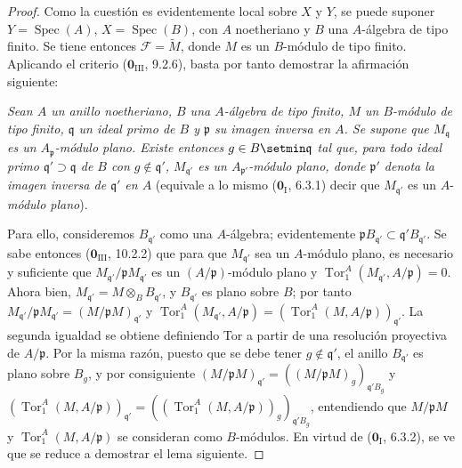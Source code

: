 \begin{proof}
Como la cuestión es evidentemente local sobre $X$ y $Y$, se puede suponer $Y=\operatorname{Spec}(A)$, $X=\operatorname{Spec}(B)$, con $A$ noetheriano y $B$ una $A$-álgebra de tipo finito. Se tiene entonces $\mathcal F=\widetilde M$, donde $M$ es un $B$-módulo de tipo finito. Aplicando el criterio ($\mathbf 0_{\mathrm{III}}$, 9.2.6), basta por tanto demostrar la afirmación siguiente:

\medskip
\begin{env}[11.1.1.1]
\label{IV.11.1.1.1}
\emph{Sean $A$ un anillo noetheriano, $B$ una $A$-álgebra de tipo finito, $M$ un $B$-módulo de tipo finito, $\mathfrak q$ un ideal primo de $B$ y $\mathfrak p$ su imagen inversa en $A$. Se supone que $M_{\mathfrak q}$ es un $A_{\mathfrak p}$-módulo plano. Existe entonces $g\in B\setmin\mathfrak q$ tal que, para todo ideal primo $\mathfrak q'\supset\mathfrak q$ de $B$ con $g\notin\mathfrak q'$, $M_{\mathfrak q'}$ es un $A_{\mathfrak p'}$-módulo plano, donde $\mathfrak p'$ denota la imagen inversa de $\mathfrak q'$ en $A$} (equivale a lo mismo ($\mathbf 0_{\mathrm I}$, 6.3.1) decir que $M_{\mathfrak q'}$ es un $A$-\emph{módulo plano}).
\end{env}
\medskip

Para ello, consideremos $B_{\mathfrak q'}$ como una $A$-álgebra; evidentemente
$\mathfrak pB_{\mathfrak q'}\subset\mathfrak q'B_{\mathfrak q'}$. Se sabe entonces
($\mathbf 0_{\mathrm{III}}$, 10.2.2) que para que $M_{\mathfrak q'}$ sea
un $A$-módulo plano, es necesario y suficiente que
$M_{\mathfrak q'}/\mathfrak pM_{\mathfrak q'}$ es un
$(A/\mathfrak p)$-módulo plano y
$\operatorname{Tor}_1^A(M_{\mathfrak q'},A/\mathfrak p)=0$.
Ahora bien, $M_{\mathfrak q'}=M\otimes_BB_{\mathfrak q'}$, y
$B_{\mathfrak q'}$ es plano sobre $B$; por tanto
$M_{\mathfrak q'}/\mathfrak pM_{\mathfrak q'}
  =(M/\mathfrak pM)_{\mathfrak q'}$
y
$\operatorname{Tor}_1^A(M_{\mathfrak q'},A/\mathfrak p)
  =(\operatorname{Tor}_1^A(M,A/\mathfrak p))_{\mathfrak q'}$.
La segunda igualdad se obtiene definiendo Tor a partir de una resolución
proyectiva de $A/\mathfrak p$. Por la misma razón, puesto que se debe tener
$g\notin\mathfrak q'$, el anillo $B_{\mathfrak q'}$ es plano sobre
$B_g$, y por consiguiente
$(M/\mathfrak pM)_{\mathfrak q'}
  =((M/\mathfrak pM)_g)_{\mathfrak q'B_g}$
y
$(\operatorname{Tor}_1^A(M,A/\mathfrak p))_{\mathfrak q'}
  =((\operatorname{Tor}_1^A(M,A/\mathfrak p))_g)_{\mathfrak q'B_g}$,
entendiendo que $M/\mathfrak pM$ y
$\operatorname{Tor}_1^A(M,A/\mathfrak p)$ se consideran
como $B$-módulos. En virtud de ($\mathbf 0_{\mathrm I}$, 6.3.2), se ve que se reduce a demostrar el lema siguiente.


\end{proof}
